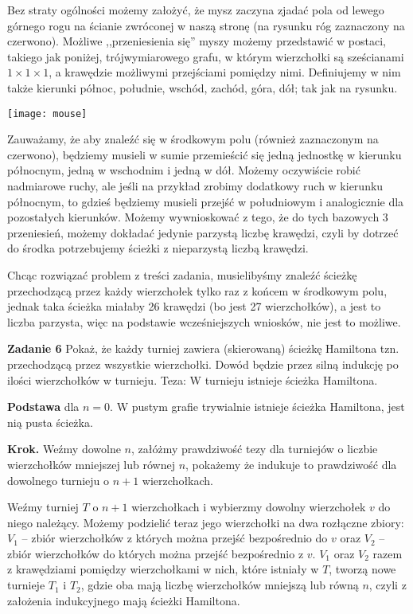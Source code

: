 \documentclass[12pt,a4paper]{article}
\begin{document}
\vskip 0.5cm

Bez straty ogólności możemy założyć, że mysz zaczyna zjadać pola od lewego górnego rogu na ścianie
zwróconej w naszą stronę (na rysunku róg zaznaczony na czerwono). Możliwe ,,przeniesienia się''
myszy możemy przedstawić w postaci, takiego jak poniżej, trójwymiarowego grafu, w którym wierzchołki są sześcianami \( 1 \times 1 \times 1\), a krawędzie możliwymi przejściami pomiędzy nimi. Definiujemy w nim także kierunki północ, południe, wschód, zachód, góra, dół; tak jak na rysunku.

\texttt{[image: mouse]}

Zauważamy, że aby znaleźć się w środkowym polu (również zaznaczonym na czerwono), będziemy musieli w 
sumie przemieścić się jedną jednostkę w kierunku północnym, jedną w wschodnim i jedną w dół. Możemy
oczywiście robić nadmiarowe ruchy, ale jeśli na przykład zrobimy dodatkowy ruch w kierunku północnym,
to gdzieś będziemy musieli przejść w południowym i analogicznie dla pozostałych kierunków. Możemy
wywnioskować z tego, że do tych bazowych 3 przeniesień, możemy dokładać jedynie parzystą liczbę krawędzi, czyli by dotrzeć do środka potrzebujemy ścieżki z nieparzystą liczbą krawędzi.

Chcąc rozwiązać problem z treści zadania, musielibyśmy znaleźć ścieżkę przechodzącą przez każdy wierzchołek tylko raz z końcem w środkowym polu, jednak taka ścieżka miałaby 26 krawędzi (bo jest 27 wierzchołków), a jest to liczba parzysta, więc na podstawie wcześniejszych wniosków, nie jest to możliwe.

\newpage



\vskip 0.5cm
\noindent
\textbf{Zadanie 6} Pokaż, że każdy turniej zawiera (skierowaną) ścieżkę Hamiltona tzn. przechodzącą
przez wszystkie wierzchołki. 
\vskip 0.2cm
Dowód będzie przez silną indukcję po ilości wierzchołków w turnieju. Teza: W turnieju istnieje ścieżka Hamiltona.

\textbf{Podstawa} dla \(n=0\). W pustym grafie trywialnie istnieje ścieżka Hamiltona, jest nią pusta ścieżka.

\textbf{Krok.} Weźmy dowolne \(n\), załóżmy prawdziwość tezy dla turniejów o liczbie wierzchołków mniejszej lub równej \(n\), pokażemy że indukuje to prawdziwość dla dowolnego turnieju o \(n+1\) wierzchołkach.

Weźmy turniej \(T\) o \(n+1\) wierzchołkach i wybierzmy dowolny wierzchołek \(v\) do niego należący. Możemy podzielić teraz jego wierzchołki na dwa rozłączne zbiory: \(V_1\) -- zbiór wierzchołków z których można przejść bezpośrednio do \(v\) oraz \(V_2\) -- zbiór wierzchołków do których można przejść bezpośrednio z \(v\). \(V_1\) oraz \(V_2\) razem z krawędziami pomiędzy wierzchołkami w nich, które istniały w \(T\), tworzą nowe turnieje \(T_1\) i \(T_2\), gdzie oba mają liczbę wierzchołków mniejszą lub równą \(n\), czyli z założenia indukcyjnego mają ścieżki Hamiltona. 
\end{document}
